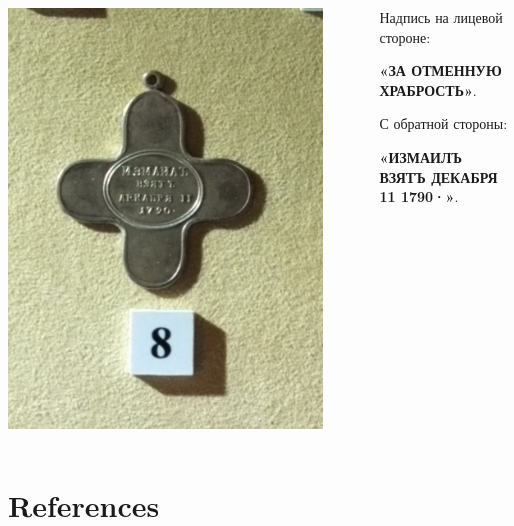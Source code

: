 \begin{frame}{}
	\begin{columns}
		\begin{column}{0.45\textwidth}
			\includegraphics[width=0.9\textwidth]{images/medal-3.jpg}
		\end{column}
		\begin{column}{0.45\textwidth}

			Надпись на лицевой стороне:

			\textbf{«ЗА ОТМЕННУЮ ХРАБРОСТЬ»}.

			С обратной стороны:

			\textbf{«ИЗМАИЛЪ ВЗЯТЪ ДЕКАБРЯ 11 1790·»}.

		\end{column}
	\end{columns}
\end{frame}

\section{References}

